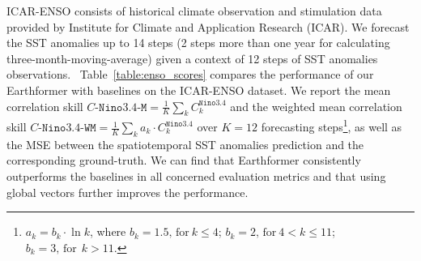 \documentclass{article}
\newcommand{\tabref}[1]{Table~\ref{#1}}
\def\Cninok{C_k^{\mathtt{Nino3.4}}}
\begin{document}
ICAR-ENSO consists of historical climate observation and stimulation data provided by Institute for Climate and Application Research (ICAR). We forecast the SST anomalies up to 14 steps (2 steps more than one year for calculating three-month-moving-average) given a context of 12 steps of SST anomalies observations. 
~\tabref{table:enso_scores} compares the performance of our Earthformer with baselines on the ICAR-ENSO dataset. 
We report the mean correlation skill $C\mbox{-}\mathtt{Nino3.4}\mbox{-}\mathtt{M}=\frac{1}{K}\sum_k \Cninok{}$ and the weighted mean correlation skill $C\mbox{-}\mathtt{Nino3.4}\mbox{-}\mathtt{WM}=\frac{1}{K}\sum_k a_k\cdot \Cninok{}$ over $K=12$ forecasting steps\footnote{$a_k = b_k\cdot\ln k$, where $b_k = 1.5\text{,\ for}\ k\leq4$; $b_k = 2\text{,\ for}\ 4<k\leq11$; $b_k = 3\text{,\ for}\ \ k > 11.$}, as well as the MSE between the spatiotemporal SST anomalies prediction and the corresponding ground-truth. 
We can find that Earthformer consistently outperforms the baselines in all concerned evaluation metrics and that using global vectors further improves the performance.
\end{document}

